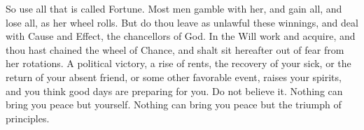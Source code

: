 \documentclass{article}
\begin{document}
So use all that is called Fortune. Most men gamble with her, and gain all,
and lose all, as her wheel rolls. But do thou leave as unlawful these
winnings, and deal with Cause and Effect, the chancellors of God. In the
Will work and acquire, and thou hast chained the wheel of Chance, and shalt
sit hereafter out of fear from her rotations. A political victory, a rise of
rents, the recovery of your sick, or the return of your absent friend, or
some other favorable event, raises your spirits, and you think good days are
preparing for you. Do not believe it. Nothing can bring you peace but
yourself. Nothing can bring you peace but the triumph of principles.
\label{theend}
\end{document}
